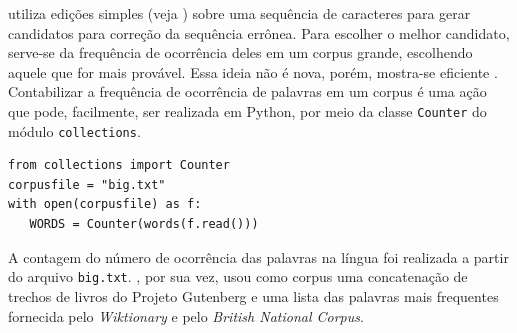 \documentclass{textolivre}
\begin{document}
\textcite{norvig2007} utiliza edições simples (veja ) sobre uma sequência de caracteres para gerar candidatos para correção
da sequência errônea. Para escolher o melhor candidato, serve-se da frequência de ocorrência deles em
um corpus grande, escolhendo aquele que for mais provável. Essa ideia não é nova, porém, mostra-se eficiente \cite{peterson80}.
Contabilizar a frequência de ocorrência de palavras em um corpus é 
uma ação que pode, facilmente, ser realizada em Python, por meio da classe 
\texttt{Counter} do módulo \texttt{collections}.
\begin{lstlisting}[label=lst-counter-spellpy]
from collections import Counter
corpusfile = "big.txt"
with open(corpusfile) as f:
   WORDS = Counter(words(f.read()))
\end{lstlisting}%
A contagem do número de ocorrência das
palavras na língua foi realizada a partir
do arquivo \texttt{big.txt}.
\textcite{norvig2007}, por sua vez,
usou como corpus uma concatenação de
trechos de livros do Projeto Gutenberg e
uma lista das palavras mais frequentes fornecida pelo \textit{Wiktionary} e pelo \textit{British National Corpus}.
\end{document}
